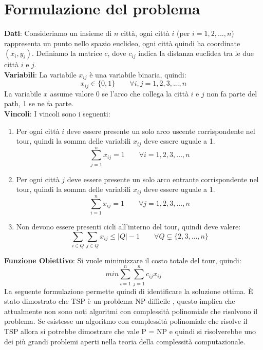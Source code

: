 \documentclass[a4paper,12pt]{report}
\begin{document}
\section{Formulazione del problema}
\textbf{Dati}: Consideriamo un insieme di $n$ città, ogni città $i$ (per $i = 1, 2, ..., n$) rappresenta un punto nello spazio euclideo, ogni città quindi ha coordinate $(x_i, y_i)$. Definiamo la matrice $c$, dove $c_{ij}$ indica la distanza euclidea tra le due città $i$ e $j$.
\\[1\baselineskip]
\textbf{Variabili}: La variabile $x_{ij}$ è una variabile binaria, quindi: $$ x_{ij} \in \{0, 1\} \qquad \forall i, j = 1, 2, 3, ..., n $$ La variabile $x$ assume valore 0 se l'arco che collega la città $i$ e $j$ non fa parte del path, 1 se ne fa parte.
\\[1\baselineskip] \textbf{Vincoli}: I vincoli sono i seguenti:
\begin{enumerate}
        \item Per ogni città $i$ deve essere presente un solo arco uscente corrispondente nel tour, quindi la somma delle variabili $x_{ij}$ deve essere uguale a 1. $$\sum_{j = 1}^{n} x_{ij} = 1 \qquad \forall i = 1, 2, 3, ..., n$$
        \item Per ogni città $j$ deve essere presente un solo arco entrante corrispondente nel tour, quindi la somma delle variabili $x_{ij}$ deve essere uguale a 1. $$\sum_{i = 1}^{n} x_{ij} = 1 \qquad \forall j = 1, 2, 3, ..., n$$
        \item Non devono essere presenti cicli all'interno del tour, quindi deve valere: $$ \sum_{i \in Q}{\sum_{j \in Q}{x_{ij} \le |Q| - 1}} \qquad \forall Q \subsetneq \{2, 3, ..., n\} $$
\end{enumerate}
\textbf{Funzione Obiettivo}: Si vuole minimizzare il costo totale del tour, quindi:
$$min \sum_{i = 1}^{n} \sum_{j = 1}^{n} c_{ij} x_{ij}$$
La seguente formulazione permette quindi di identificare la soluzione ottima.
\newline \null \newline È stato dimostrato che TSP è un problema NP-difficile \cite{TSP NP Completezza}, questo implica che attualmente non sono noti algoritmi con complessità polinomiale che risolvono il problema. Se esistesse un algoritmo con complessità polinomiale che risolve il TSP allora si potrebbe dimostrare che vale P = NP e quindi si risolverebbe uno dei più grandi problemi aperti nella teoria della complessità computazionale.
\end{document}

